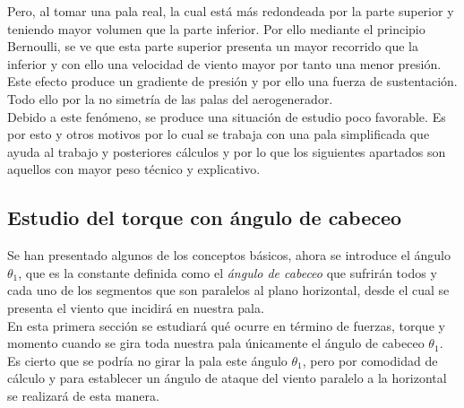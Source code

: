 Pero, al tomar una pala real, la cual está más redondeada por la parte superior y teniendo mayor volumen que la parte inferior. Por ello mediante el principio Bernoulli, se ve que esta parte superior presenta un mayor recorrido que la inferior y con ello una velocidad de viento mayor por tanto una menor presión. \\

Este efecto produce un gradiente de presión y por ello una fuerza de sustentación. Todo ello por la no simetría de las palas del aerogenerador. \\

Debido a este fenómeno, se produce una situación de estudio poco favorable. Es por esto y otros motivos por lo cual se trabaja con una pala simplificada que ayuda al trabajo y posteriores cálculos y por lo que los siguientes apartados son aquellos con mayor peso técnico y explicativo. \\





















\subsection{Estudio del torque con ángulo de cabeceo}
\label{section:torque_giro_inicial}

Se han presentado algunos de los conceptos básicos, ahora se introduce el ángulo $ \theta_1 $, que es la constante definida como el \textit{ángulo de cabeceo} que sufrirán todos y cada uno de los segmentos que son paralelos al plano horizontal, desde el cual se presenta el viento que incidirá en nuestra pala.\\


En esta primera sección se estudiará qué ocurre en término de fuerzas, torque y momento cuando se gira toda nuestra pala únicamente el ángulo de cabeceo $ \theta_1 $. \\


Es cierto que se podría no girar la pala este ángulo $ \theta_1 $, pero por comodidad de cálculo y para establecer un ángulo de ataque del viento paralelo a la horizontal se realizará de esta manera.\\


